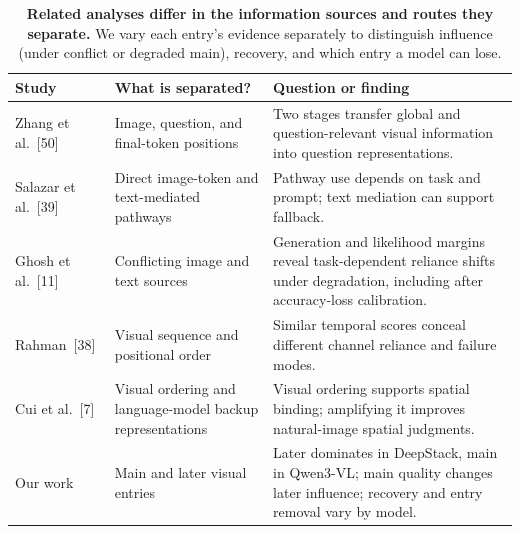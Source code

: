 \begin{table}[t]
\centering
\caption{\textbf{Related analyses differ in the information sources and routes they separate.} We vary each entry's evidence separately to distinguish influence (under conflict or degraded main), recovery, and which entry a model can lose.}
\label{tab:related_work}
\begingroup
\fontsize{9}{10.5}\selectfont
\setlength{\tabcolsep}{5pt}
\renewcommand{\arraystretch}{1.08}
\begin{tabularx}{\linewidth}{@{}>{\raggedright\arraybackslash}p{.16\linewidth}>{\raggedright\arraybackslash}p{.30\linewidth}>{\raggedright\arraybackslash}X@{}}
\toprule
\rowcolor{DSTableHeader}
Study & What is separated? & Question or finding \\
\midrule
Zhang et al.\ [50] & Image, question, and final-token positions & Two stages transfer global and question-relevant visual information into question representations. \\
\addlinespace[3pt]
Salazar et al.\ [39] & Direct image-token and text-mediated pathways & Pathway use depends on task and prompt; text mediation can support fallback. \\
\addlinespace[3pt]
Ghosh et al.\ [11] & Conflicting image and text sources & Generation and likelihood margins reveal task-dependent reliance shifts under degradation, including after accuracy-loss calibration. \\
\addlinespace[3pt]
Rahman\ [38] & Visual sequence and positional order & Similar temporal scores conceal different channel reliance and failure modes. \\
\addlinespace[3pt]
Cui et al.\ [7] & Visual ordering and language-model backup representations & Visual ordering supports spatial binding; amplifying it improves natural-image spatial judgments. \\
\addlinespace[3pt]
\rowcolor{DSTableAccent}
Our work & Main and later visual entries & Later dominates in DeepStack, main in Qwen3-VL; main quality changes later influence; recovery and entry removal vary by model. \\
\bottomrule
\end{tabularx}
\endgroup
\end{table}
